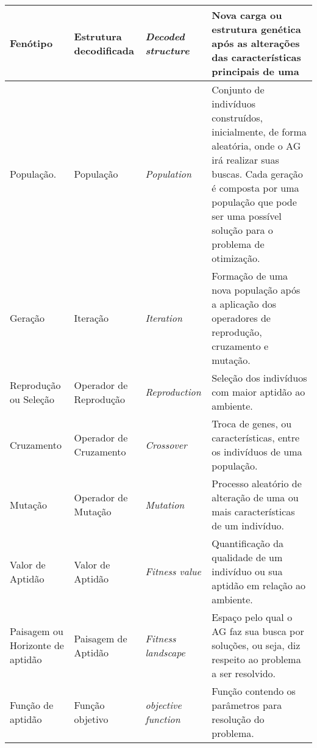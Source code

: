 \begin{appendices}
\begin{table}[h!]
\begin{tabular}{ | >{\centering\arraybackslash}m{} | >{\centering\arraybackslash}m{} | >{\centering\arraybackslash}m{} | >{\centering\arraybackslash}m{} | }
        Fenótipo                           &   Estrutura decodificada             &   \textit{Decoded structure}                  & Nova carga ou estrutura genética após as alterações das características principais de uma \\ \hline
        População.                         &   População                          &   \textit{Population}                         & Conjunto de indivíduos construídos, inicialmente, de forma aleatória, onde o AG irá realizar suas buscas. Cada geração é composta por uma população que pode ser uma possível solução para o problema de otimização.                                                                                                   \\ \hline                           Geração                            &   Iteração                           &   \textit{Iteration}                          & Formação de uma nova população após a aplicação dos operadores de reprodução, cruzamento e mutação. \\ \hline 
        Reprodução ou Seleção              &   Operador de Reprodução             &   \textit{Reproduction}                       & Seleção dos indivíduos com maior aptidão ao ambiente. \\ \hline 
        Cruzamento                         &   Operador de Cruzamento             &   \textit{Crossover}                          & Troca de genes, ou características, entre os indivíduos de uma população. \\ \hline 
        Mutação                            &   Operador de Mutação                &   \textit{Mutation}                           & Processo aleatório de alteração de uma ou mais características de um indivíduo. \\ \hline 
        Valor de Aptidão                   &   Valor de Aptidão                   &   \textit{Fitness value}                      & Quantificação da qualidade de um indivíduo ou sua aptidão em relação ao ambiente. \\ \hline
        Paisagem ou Horizonte de aptidão   &   Paisagem de Aptidão                &   \textit{Fitness landscape}                  & Espaço pelo qual o AG faz sua busca por soluções, ou seja, diz respeito ao problema a ser resolvido. \\ \hline
        Função de aptidão                  &   Função objetivo                    &   \textit{objective function}                 & Função contendo os parâmetros para resolução do problema.
\end{tabular}
\\
\begin{minipage}{1 \textwidth}
\end{minipage}
\end{table}
\label{appx:TerminologiaNaturalComputacional}


\end{appendices}
